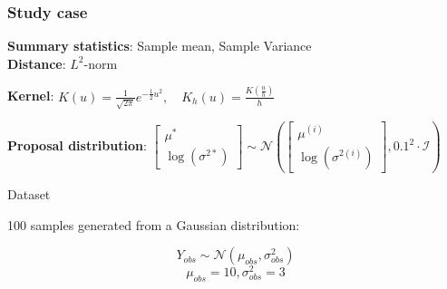 \documentclass{beamer}
\begin{document}
\begin{frame}
{\begin{itemize}
			\end{itemize}
			
		

	}

\end{frame}

	
\begin{frame}
		\frametitle{Study case}
		
		\textbf{Summary statistics}: Sample mean, Sample Variance \\
	
	
		\textbf{Distance}: $L^2$-norm
		
		\textbf{Kernel}: $
		K(u) = 
		\frac{1}{\sqrt{2\pi}} e^{-\frac{1}{2}u^2}, 
		\quad K_h(u) 
		= \frac{K(\frac{u}{h})}{h}
		$
%		

		\textbf{Proposal distribution}:	
		$	 
			\begin{bmatrix}    %
				\mu^{*} \\ 
				\log(\sigma^{2*})	
			\end{bmatrix} 
			\sim \mathcal{N} \left( 
			\begin{bmatrix}    %
				\mu^{(i)} \\ 
				\log(\sigma^{2(i)})
			\end{bmatrix}, 
			0.1^2 \cdot \mathcal{I} \right)
		$
	
	\pause
	
		
		\begin{block}{Dataset}
		
			100 samples generated from a Gaussian distribution:
			
				$$ Y_{obs} \sim \mathcal{N}(\mu_{obs}, \sigma_{obs}^{2}) $$
				$$	\mu_{obs} = 10,	\sigma_{obs}^{2} = 3	$$
		
		\end{block}
		
\end{frame}
	
\end{document}
